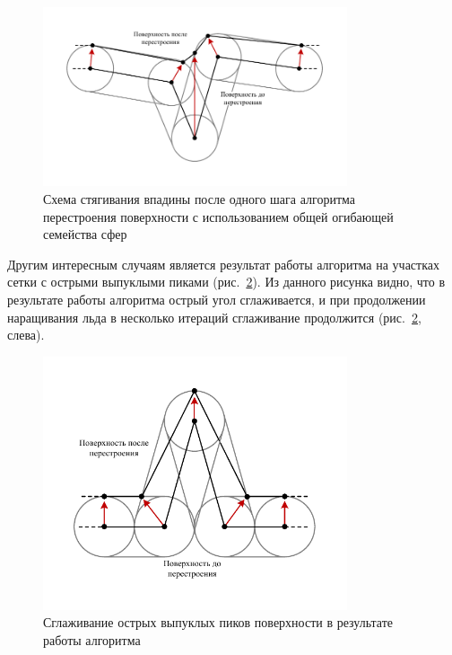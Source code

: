 \begin{figure}[ht]
	\centering
		\includegraphics[width=0.80\textwidth]{./pics/text_1_remesh_common_envelope/out_from_cave.pdf}
	\caption{Схема стягивания впадины после одного шага алгоритма перестроения поверхности с использованием общей огибающей семейства сфер}
	\label{fig:text_1_remesh_common_envelope_4}
\end{figure}

Другим интересным случаям является результат работы алгоритма на участках сетки с острыми выпуклыми пиками (рис.~\ref{fig:text_1_remesh_common_envelope_5}).
Из данного рисунка видно, что в результате работы алгоритма острый угол сглаживается, и при продолжении наращивания льда в несколько итераций сглаживание продолжится (рис.~\ref{fig:text_1_remesh_common_envelope_5}, слева).

\begin{figure}[ht]
	\centering
		\includegraphics[width=0.80\textwidth]{./pics/text_1_remesh_common_envelope/peak1.pdf}
	\caption{Сглаживание острых выпуклых пиков поверхности в результате работы алгоритма}
	\label{fig:text_1_remesh_common_envelope_5}
\end{figure}

